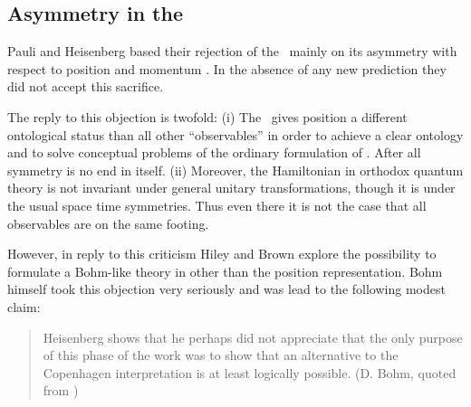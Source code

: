 \subsection{Asymmetry in the \dbb\label{as}}
Pauli and Heisenberg based their rejection of the \dbb\ mainly on its asymmetry with 
respect to position and momentum \cite{early}. In the absence of any new prediction they 
did not accept this sacrifice. 

The reply to this objection is twofold: (i) The \dbb\ gives position a different ontological status than all other ``observables'' 
\cite{nor} in order to achieve a clear ontology and to solve conceptual problems of the ordinary formulation of \qm. 
After all symmetry is no end in itself. (ii) Moreover, the Hamiltonian in orthodox quantum theory is not invariant under general  
unitary transformations, though it is under the usual space time symmetries. Thus even there it is not 
the case that all observables are on the same footing.



However, in reply to this criticism Hiley and Brown \cite{hiley00,hiley_neu} explore the possibility 
to formulate a Bohm-like theory in other than the position representation. 
Bohm himself took this objection very seriously and was lead to the following modest claim:  
\begin{quote} 
Heisenberg shows that he perhaps did not appreciate that the only purpose 
of this phase of the work was to show that an alternative to the Copenhagen 
interpretation is at least logically possible. 
(D. Bohm, quoted from \cite{early}) 
\end{quote} 

